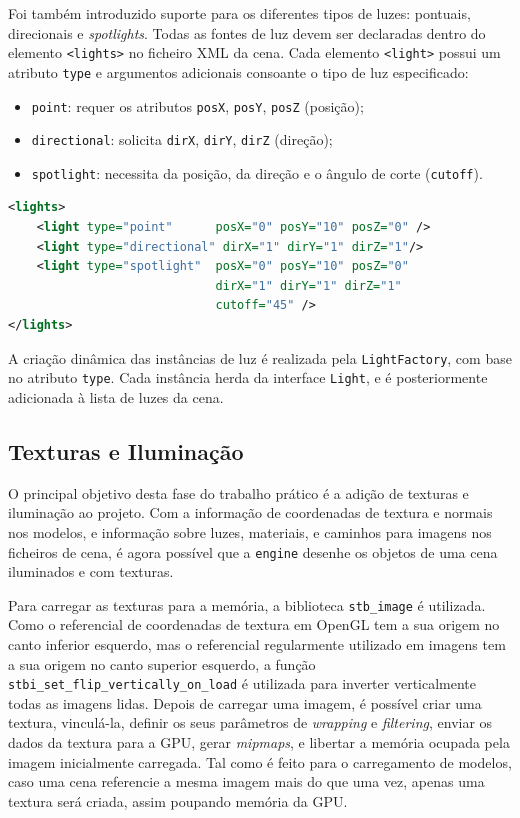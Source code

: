 \documentclass[12pt, a4paper]{article}
\begin{document}
Foi também introduzido suporte para os diferentes tipos de luzes: pontuais, direcionais e
\emph{spotlights}. Todas as fontes de luz devem ser declaradas dentro do elemento \texttt{<lights>}
no ficheiro XML da cena. Cada elemento \texttt{<light>} possui um atributo \texttt{type} e
argumentos adicionais consoante o tipo de luz especificado:

\begin{itemize}
    \item \texttt{point}: requer os atributos \texttt{posX}, \texttt{posY}, \texttt{posZ} (posição);
    \item \texttt{directional}: solicita \texttt{dirX}, \texttt{dirY}, \texttt{dirZ} (direção);
    \item \texttt{spotlight}: necessita da posição, da direção e o ângulo de corte
    (\texttt{cutoff}).
\end{itemize}

\begin{lstlisting}[language=xml]
<lights>
    <light type="point"      posX="0" posY="10" posZ="0" />
    <light type="directional" dirX="1" dirY="1" dirZ="1"/>
    <light type="spotlight"  posX="0" posY="10" posZ="0"
                             dirX="1" dirY="1" dirZ="1"
                             cutoff="45" />
</lights>
\end{lstlisting}

A criação dinâmica das instâncias de luz é realizada pela \texttt{LightFactory}, com base no
atributo \texttt{type}. Cada instância herda da interface \texttt{Light}, e é posteriormente
adicionada à lista de luzes da cena.

\subsection{Texturas e Iluminação}

O principal objetivo desta fase do trabalho prático é a adição de texturas e iluminação ao projeto.
Com a informação de coordenadas de textura e normais nos modelos, e informação sobre luzes,
materiais, e caminhos para imagens nos ficheiros de cena, é agora possível que a \texttt{engine}
desenhe os objetos de uma cena iluminados e com texturas.

Para carregar as texturas para a memória, a biblioteca \texttt{stb\_image} \cite{stb-image} é
utilizada. Como o referencial de coordenadas de textura em OpenGL tem a sua origem no canto inferior
esquerdo, mas o referencial regularmente utilizado em imagens tem a sua origem no canto superior
esquerdo, a função \texttt{stbi\_set\_flip\_vertically\_on\_load} é utilizada para inverter
verticalmente todas as imagens lidas. Depois de carregar uma imagem, é possível criar uma textura,
vinculá-la, definir os seus parâmetros de \emph{wrapping} e \emph{filtering}, enviar os dados da
textura para a GPU, gerar \emph{mipmaps}, e libertar a memória ocupada pela imagem inicialmente
carregada. Tal como é feito para o carregamento de modelos, caso uma cena referencie a mesma imagem
mais do que uma vez, apenas uma textura será criada, assim poupando memória da GPU.
\end{document}

